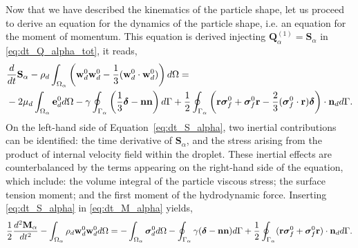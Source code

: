 Now that we have described the kinematics   of the particle shape, let us proceed to derive an equation for the dynamics of the particle shape, i.e. an equation for the moment of momentum. 
This equation is derived injecting $\textbf{Q}_\alpha^{(1)} = \textbf{S}_\alpha$ in \ref{eq:dt_Q_alpha_tot}, it reads, 
\begin{align}
    &\ddt {\textbf{S}_\alpha}
    - \rho_d\intO{\left(\textbf{w}_d^0 \textbf{w}_d^0 -\frac{1}{3} (\textbf{w}_d^0 \cdot  \textbf{w}_d^0)\right)}
    = \\
    &- 2\mu_d\intO{\textbf{e}_d^0}
    - \gamma \intS{ 
        \left( \frac{1}{3}\bm\delta - \textbf{nn} \right)
    }
    + \frac{1}{2}\intS{\left(\textbf{r}\bm\sigma_f^0+\bm\sigma_f^0\textbf{r}-\frac{2}{3}(\bm\sigma_f^0 \cdot \textbf{r})\bm\delta \right)\cdot \textbf{n}_d}.
    \label{eq:dt_S_alpha}
\end{align}
On the left-hand side of Equation~\ref{eq:dt_S_alpha}, two inertial contributions can be identified: the time derivative of $\mathbf{S}_\alpha$, and the stress arising from the product of internal velocity field within the droplet. 
These inertial effects are counterbalanced by the terms appearing on the right-hand side of the equation, which include: the volume integral of the particle viscous stress; the surface tension moment; and the first moment of the hydrodynamic force.
Inserting \ref{eq:dt_S_alpha} in  \ref{eq:dt_M_alpha} yields,
\begin{equation}    
    \frac{1}{2}\frac{d^2 \textbf{M}_\alpha}{dt^2}
    - \intO{ \rho_d  \textbf{w}_d^0 \textbf{w}_d^0 }
    = 
    - \intO{\bm{\sigma}_d^0}
    - \intS{\gamma (\bm\delta - \textbf{nn})}
    + \frac{1}{2}\intS{(\textbf{r}\bm{\sigma}_f^0+\bm{\sigma}_f^0 \textbf{r})\cdot \textbf{n}_d}.
    \label{eq:dt_S_alpha}
\end{equation}
